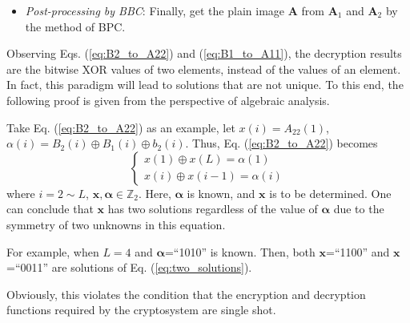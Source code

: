 \documentclass[final,3p,times,twocolumn]{elsarticle}
\begin{document}
\begin{itemize}
	Step 3. Recover $\bm{A}_{11}$ by performing the bitwise XOR operations between $\bm{B}_{1}$, $\bm{A}_{2}$ and $\bm{b}_{1}$, given as
	\begin{equation}
	\left\{ \begin{array}{l}
	A_{11}(1) \oplus A_{11}(L) = B_1(1) \oplus A_{2}(1) \oplus b_{1}(1)\\
	A_{11}(i) \oplus A_{11}(i-1) B_1(i) \oplus A_{2}(i) \oplus b_{1}(i)
	\end{array} \right.
	\label{eq:B1_to_A11}
	\end{equation}
	where $i=2 \sim L$.
	
	Step 4. Obtain $sum_1$ by Eq. (\ref{eq:sum1}), and then get $\bm{A}_{1}$ by doing cyclic left shift operation on $\bm{A}_{11}$ with $sum_1$ bits.
	
	\item \emph{Post-processing by BBC}:
	Finally, get the plain image $\bm{A}$ from $\bm{A}_1$ and $\bm{A}_2$ by the method of BPC.
\end{itemize}

Observing Eqs. (\ref{eq:B2_to_A22}) and (\ref{eq:B1_to_A11}), the decryption results are the bitwise XOR values of two elements, instead of the values of an element. In fact, this paradigm will lead to solutions that are not unique. To this end, the following proof is given from the perspective of algebraic analysis. 

Take Eq. (\ref{eq:B2_to_A22}) as an example, let $x(i)=A_{22}(1)$, $\alpha(i)=B_2(i) \oplus B_{1}(i) \oplus b_{2}(i)$. Thus, Eq. (\ref{eq:B2_to_A22}) becomes
\begin{equation}
\left\{ \begin{array}{l}
x(1) \oplus x(L)  = \alpha(1)\\
x(i) \oplus x(i-1) = \alpha(i)
\end{array} \right.
\label{eq:two_solutions}
\end{equation}
where $i=2 \sim L$, $\bm{x},\bm{\alpha} \in \mathbb{Z}_{2}$. Here, $\bm{\alpha}$ is known, and $\bm{x}$ is to be determined.
One can conclude that $\bm{x}$ has two solutions regardless of the value of $\bm{\alpha}$ due to the symmetry of two unknowns in this equation.

For example, when $L=4$ and $\bm{\alpha}$=``1010'' is known. Then, both $\bm{x}$=``1100'' and $\bm{x}$=``0011'' are solutions of Eq. (\ref{eq:two_solutions}).

Obviously, this violates the condition that the encryption and decryption functions required by the cryptosystem are single shot.
\end{document}
